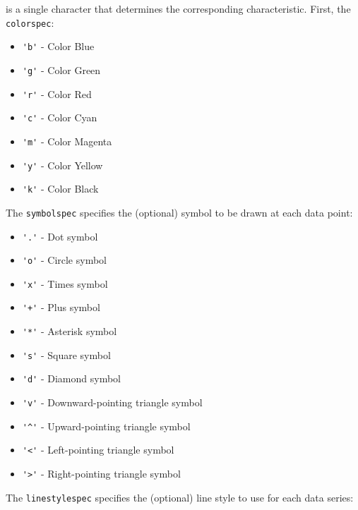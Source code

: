 is a single character that determines the corresponding characteristic.  First, the 
\verb|colorspec|:
\begin{itemize}
\item  \verb|'b'| - Color Blue

\item  \verb|'g'| - Color Green

\item  \verb|'r'| - Color Red

\item  \verb|'c'| - Color Cyan

\item  \verb|'m'| - Color Magenta

\item  \verb|'y'| - Color Yellow

\item  \verb|'k'| - Color Black

\end{itemize}
The \verb|symbolspec| specifies the (optional) symbol to be drawn at each data point:
\begin{itemize}
\item  \verb|'.'| - Dot symbol

\item  \verb|'o'| - Circle symbol

\item  \verb|'x'| - Times symbol

\item  \verb|'+'| - Plus symbol

\item  \verb|'*'| - Asterisk symbol

\item  \verb|'s'| - Square symbol

\item  \verb|'d'| - Diamond symbol

\item  \verb|'v'| - Downward-pointing triangle symbol

\item  \verb|'^'| - Upward-pointing triangle symbol

\item  \verb|'<'| - Left-pointing triangle symbol

\item  \verb|'>'| - Right-pointing triangle symbol

\end{itemize}
The \verb|linestylespec| specifies the (optional) line style to use for each data series:
